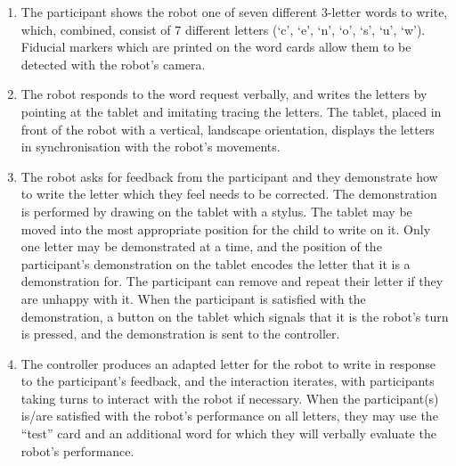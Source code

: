 \documentclass{sig-alternate}
\begin{document}
\begin{enumerate}

    \item The participant shows the robot one of seven different 3-letter words
        to write, which, combined, consist of 7 different letters (`c', `e',
        `n', `o', `s', `u', `w'). Fiducial markers which are printed on the word
        cards allow them to be detected with the robot's camera. 

    \item The robot responds to the word request verbally, and writes the
        letters by pointing at the tablet and imitating tracing the letters. The
        tablet, placed in front of the robot with a vertical, landscape orientation,
        displays the letters in synchronisation with the robot's movements. 

    \item The robot asks for feedback from the participant and they demonstrate
        how to write the letter which they feel needs to be corrected. The
        demonstration is performed by drawing on the tablet with a stylus. The
        tablet may be moved into the most appropriate position for the child to
        write on it. Only one letter may be demonstrated at a time, and the
        position of the participant's demonstration on the tablet encodes the
        letter that it is a demonstration for. The participant can remove and
        repeat their letter if they are unhappy with it.
        When the participant is satisfied with the demonstration, a button on
        the tablet which signals that it is the robot's turn is pressed, and the
        demonstration is sent to the controller.

    \item The controller produces an adapted letter for the robot to write in
        response to the participant's feedback, and the interaction iterates,
        with participants taking turns to interact with the robot if necessary.
        When the participant(s) is/are satisfied with the robot's performance on 
	all letters,
        they may use the ``test'' card and an additional word for which they will
        verbally evaluate the robot's performance. 

\end{enumerate}

	
\end{document}
